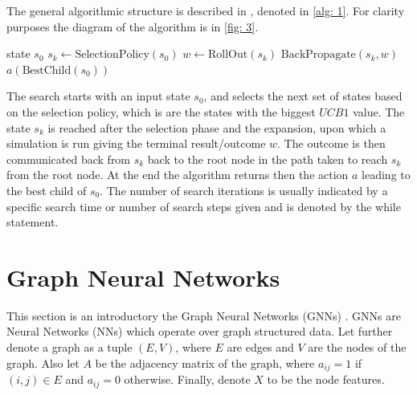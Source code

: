 The general algorithmic structure is described in \cite{mcts_survey}, denoted
in \ref{alg: 1}. For clarity purposes the diagram of the algorithm is in
\ref{fig: 3}.
\begin{algorithm}
\caption{MCTS Algorithm}\label{alg: 1}
    \begin{algorithmic}
        \Require state $s_0$
            \State $s_k \gets \text{SelectionPolicy}(s_0)$
            \State  $w \gets \text{RollOut}(s_k)$
            \State $\text{BackPropagate}(s_k, w)$
        \EndWhile
        \Ensure $a\left(\text{BestChild}(s_0)\right)$
    \end{algorithmic}
\end{algorithm}
The search starts with an input state $s_0$, and selects the next set of
states based on the selection policy, which is are the states with the
biggest $UCB1$ value. The state $s_k$ is reached after the selection phase
and the expansion, upon which a simulation is run giving the terminal
result/outcome $w$. The outcome is then communicated back from $s_k$ back to the
root node in the path taken to reach $s_k$ from the root node. At the end the
algorithm returns then the  action $a$ leading to the best child of $s_0$.
The number of search iterations is usually indicated by a specific search
time or number of search steps given and is denoted by the while statement.

\section{Graph Neural Networks \label{sec: gnn}}
This section is an introductory the Graph Neural Networks (GNNs)
\cite{gnn_overview}. GNNs are Neural Networks (NNs) which operate over graph
structured data. Let further denote a graph as a tuple $(E, V)$, where $E$
are edges and $V$ are the nodes of the graph. Also let $A$ be the adjacency
matrix of the graph, where $a_{ij} = 1$ if $(i, j) \in E$ and $a_{ij} =0$
otherwise. Finally, denote $X$ to be the node features.
\newline

